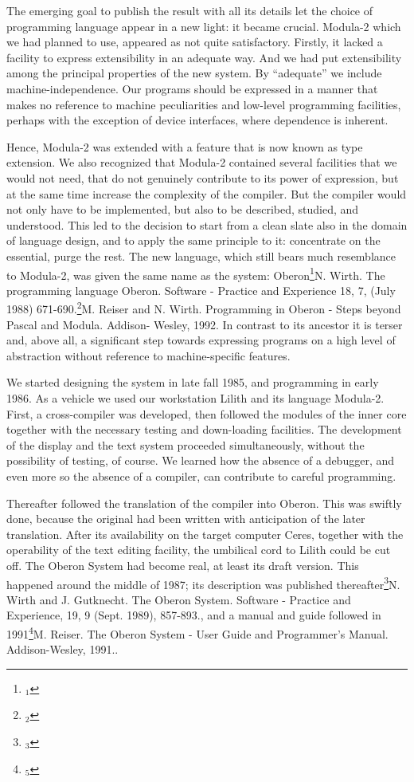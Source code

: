 The emerging goal to publish the result with all its details let the
choice of programming language appear in a new light: it became
crucial. Modula-2 which we had planned to use, appeared as not quite
satisfactory. Firstly, it lacked a facility to express extensibility
in an adequate way. And we had put extensibility among the principal
properties of the new system. By ``adequate'' we include
machine-independence. Our programs should be expressed in a manner
that makes no reference to machine peculiarities and low-level
programming facilities, perhaps with the exception of device
interfaces, where dependence is inherent.

Hence, Modula-2 was extended with a feature that is now known as type
extension. We also recognized that Modula-2 contained several
facilities that we would not need, that do not genuinely contribute to
its power of expression, but at the same time increase the complexity
of the compiler. But the compiler would not only have to be
implemented, but also to be described, studied, and understood. This
led to the decision to start from a clean slate also in the domain of
language design, and to apply the same principle to it: concentrate on
the essential, purge the rest. The new language, which still bears
much resemblance to Modula-2, was given the same name as the system:
Oberon\footnote{$_1$}{N. Wirth. The programming language Oberon. Software - Practice and Experience 18, 7, (July 1988) 671-690.}\footnote{$_2$}{M. Reiser and N. Wirth. Programming in Oberon - Steps beyond Pascal and Modula. Addison- Wesley, 1992.}
In contrast to its ancestor it is terser and, above
all, a significant step towards expressing programs on a high level of
abstraction without reference to machine-specific features.

We started designing the system in late fall 1985, and programming in
early 1986. As a vehicle we used our workstation Lilith and its
language Modula-2. First, a cross-compiler was developed, then
followed the modules of the inner core together with the necessary
testing and down-loading facilities. The development of the display
and the text system proceeded simultaneously, without the possibility
of testing, of course. We learned how the absence of a debugger, and
even more so the absence of a compiler, can contribute to careful
programming.

Thereafter followed the translation of the compiler into Oberon. This
was swiftly done, because the original had been written with
anticipation of the later translation. After its availability on the
target computer Ceres, together with the operability of the text
editing facility, the umbilical cord to Lilith could be cut off. The
Oberon System had become real, at least its draft version. This
happened around the middle of 1987; its description was published
thereafter\footnote{$_3$}{N. Wirth and J. Gutknecht. The Oberon System. Software - Practice and Experience, 19, 9 (Sept. 1989), 857-893.}, and a manual and guide followed in 1991\footnote{$_5$}{M. Reiser. The Oberon System - User Guide and Programmer's Manual. Addison-Wesley, 1991.}.

